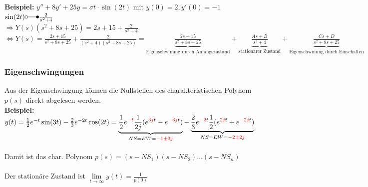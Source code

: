 		\begin{minipage}[l]{16cm}
				\textbf{Beispiel:} $y'' + 8y' + 25y = \sigma{t} \cdot \sin(2t)$ mit $y(0) = 2, y'(0) = -1$\\
				
				$\sin(2t) \laplace \frac{2}{s^2+4}$ \\
				
				$\Rightarrow Y(s)(s^2+8s+25) = 2s+15+\frac{2}{s^2+4}$\\
				
				$\Leftrightarrow Y(s) = \frac{2s+15}{s^2+8s+25}+\frac{2}{(s^2+4)(s^2+8s+25)}=
				\underbrace{\frac{2s+15}{s^2+8s+25}}_\text{Eigenschwinung durch Anfangszustand} +
				\underbrace{\frac{As + B}{s^2+4}}_\text{stationärer Zustand} +
				\underbrace{\frac{Cs + D}{s^2+8s+25}}_\text{Eigenschwinung durch Einschalten}$
		\end{minipage}
		
		\subsubsection{Eigenschwingungen}
			Aus der Eigenschwingung können die Nullstellen des charakteristischen Polynom $p(s)$ 
			direkt abgelesen werden. \\
			\textbf{Beispiel:} \\
			$y(t) = \frac{1}{2} e^{-t} \sin(3t) - \frac{2}{3} e^{-2t} \cos(2t) = 
			\underbrace{\frac{1}{2} e^{\textcolor{red}{-t}} \frac{1}{2j}(e^{\textcolor{red}{3j}t}
			-e^{\textcolor{red}{-3j}t})}_{NS = EW = \textcolor{red}{-1 \pm 3j}} - 
			\underbrace{\frac{2}{3} e^{\textcolor{red}{-2}t} \frac{1}{2}(e^{\textcolor{red}{2j}t}
			+e^{\textcolor{red}{-2j}t})}_{NS = EW = \textcolor{red}{-2 \pm 2j}}$ \\\\
			Damit ist das char. Polynom $p(s) = (s-NS_1)(s-NS_2)\ldots(s-NS_n)$ \\\\
			Der stationäre Zustand ist $\lim\limits_{t\rightarrow\infty}y(t) = \frac{1}{p(0)}$ \\
			